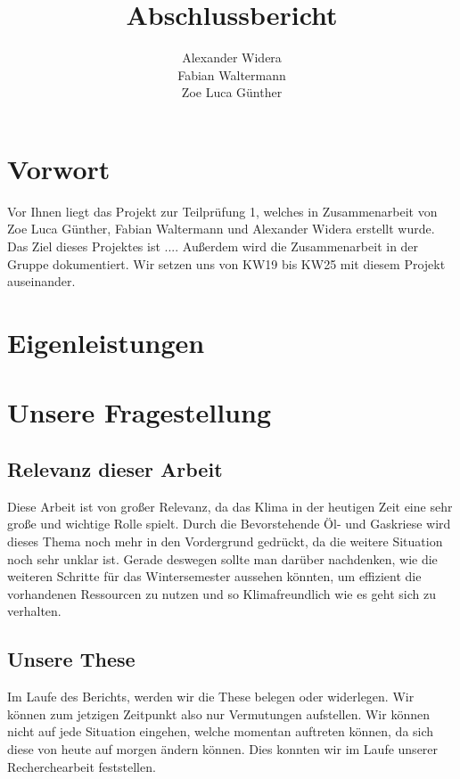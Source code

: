 \documentclass[a4paper,12pt]{scrartcl}
\title {\textbf{Abschlussbericht}}
\author{Alexander Widera \\ Fabian Waltermann \\ Zoe Luca Günther}
\begin{document}
\maketitle
\newpage
\tableofcontents
\newpage
{}

\section{Vorwort}
Vor Ihnen liegt das Projekt zur Teilprüfung 1, welches in Zusammenarbeit von Zoe
Luca Günther, Fabian Waltermann und Alexander Widera erstellt wurde. Das Ziel dieses
Projektes ist .... Außerdem wird die Zusammenarbeit in der Gruppe dokumentiert.
Wir setzen uns von KW19 bis KW25 mit diesem Projekt auseinander.

\section{Eigenleistungen}
\newpage

\section{Unsere Fragestellung}
\subsection{Relevanz dieser Arbeit}
Diese Arbeit ist von großer Relevanz, da das Klima in der heutigen Zeit eine sehr große und wichtige Rolle spielt. Durch die Bevorstehende Öl- und Gaskriese wird dieses Thema noch mehr in den Vordergrund gedrückt, da die weitere Situation noch sehr unklar ist. Gerade deswegen sollte man darüber nachdenken, wie die weiteren Schritte für das Wintersemester aussehen könnten, um effizient die vorhandenen Ressourcen zu nutzen und so Klimafreundlich wie es geht sich zu verhalten.

\subsection{Unsere These}
Im Laufe des Berichts, werden wir die These belegen oder widerlegen. Wir können zum jetzigen Zeitpunkt also nur Vermutungen aufstellen. Wir können nicht auf jede Situation eingehen, welche momentan auftreten können, da sich diese von heute auf morgen ändern können. Dies konnten wir im Laufe unserer Recherchearbeit feststellen.\\\\
\end{document}
